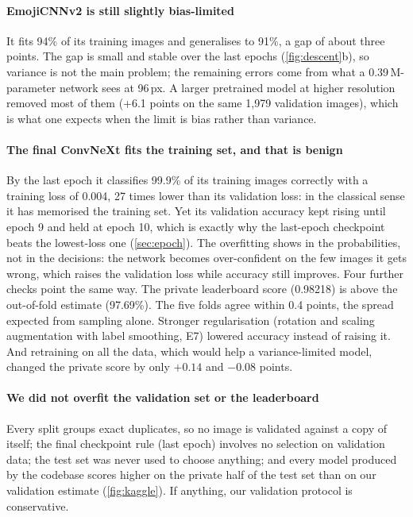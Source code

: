 \paragraph{EmojiCNNv2 is still slightly bias-limited} It fits 94\% of its training images and generalises to 91\%, a gap of about three points. The gap is small and stable over the last epochs (\cref{fig:descent}b), so variance is not the main problem; the remaining errors come from what a 0.39\,M-parameter network sees at 96\,px. A larger pretrained model at higher resolution removed most of them (+6.1 points on the same 1{,}979 validation images), which is what one expects when the limit is bias rather than variance.

\paragraph{The final ConvNeXt fits the training set, and that is benign} By the last epoch it classifies 99.9\% of its training images correctly with a training loss of 0.004, 27 times lower than its validation loss: in the classical sense it has memorised the training set. Yet its validation accuracy kept rising until epoch 9 and held at epoch 10, which is exactly why the last-epoch checkpoint beats the lowest-loss one (\cref{sec:epoch}). The overfitting shows in the probabilities, not in the decisions: the network becomes over-confident on the few images it gets wrong, which raises the validation loss while accuracy still improves. Four further checks point the same way. The private leaderboard score (0.98218) is above the out-of-fold estimate (97.69\%). The five folds agree within 0.4 points, the spread expected from sampling alone. Stronger regularisation (rotation and scaling augmentation with label smoothing, E7) lowered accuracy instead of raising it. And retraining on all the data, which would help a variance-limited model, changed the private score by only $+0.14$ and $-0.08$ points.

\paragraph{We did not overfit the validation set or the leaderboard} Every split groups exact duplicates, so no image is validated against a copy of itself; the final checkpoint rule (last epoch) involves no selection on validation data; the test set was never used to choose anything; and every model produced by the codebase scores higher on the private half of the test set than on our validation estimate (\cref{fig:kaggle}). If anything, our validation protocol is conservative.
